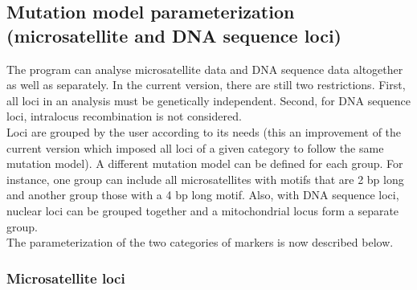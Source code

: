 \newpage{}


\subsection{Mutation model parameterization (microsatellite and DNA sequence
loci)}

The program can analyse microsatellite data and DNA sequence data
altogether as well as separately. In the current version, there are
still two restrictions. First, all loci in an analysis must be genetically
independent. Second, for DNA sequence loci, intralocus recombination
is not considered.\\


Loci are grouped by the user according to its needs (this an improvement
of the current version which imposed all loci of a given category
to follow the same mutation model). A different mutation model can
be defined for each group. For instance, one group can include all
microsatellites with motifs that are 2 bp long and another group those
with a 4 bp long motif. Also, with DNA sequence loci, nuclear loci
can be grouped together and a mitochondrial locus form a separate
group.\\


The parameterization of the two categories of markers is now described
below.


\subsubsection{Microsatellite loci}

